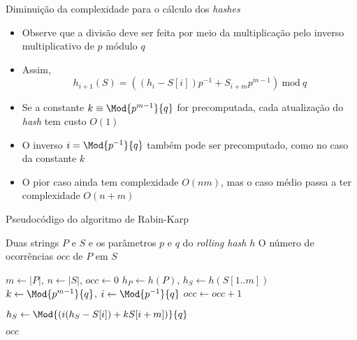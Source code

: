 \begin{frame}[fragile]{Diminuição da complexidade para o cálculo dos {\it hashes}}

    \begin{itemize}
        \item Observe que a divisão deve ser feita por meio da multiplicação pelo inverso
            multiplicativo de $p$ módulo $q$
        \pause

        \item Assim,
        \[
            h_{i+1}(S) = \left((h_{i} - S[i])p^{-1} + S_{i+m}p^{m -1}\right)\ \mbox{mod}\ q
        \]
        \pause

        \item Se a constante $k\equiv \Mod{p^{m-1}}{q}$ for precomputada, cada atualização do
            \textit{hash} tem custo $O(1)$
        \pause

        \item O inverso $i = \Mod{p^{-1}}{q}$ também pode ser precomputado, como no caso da constante $k$
        \pause

        \item O pior caso ainda tem complexidade $O(nm)$, mas o caso médio passa a ter
            complexidade $O(n + m)$

    \end{itemize}

\end{frame}

\begin{frame}[fragile]{Pseudocódigo do algoritmo de Rabin-Karp}

    \begin{algorithm}[H]
        \caption{Algoritmo de Rabin-Karp com \textit{Rolling Hash}}
        \begin{algorithmic}[1]
            \Require Duas strings $P$ e $S$ e os parâmetros $p$ e $q$ do \textit{rolling hash} $h$
            \Ensure O número de ocorrências $occ$ de $P$ em $S$

                \State $m \gets |P|$, $n \gets |S|$, $occ \gets 0$
                \State $h_P \gets h(P)$, $h_S \gets h(S[1..m])$
                \State $k \gets \Mod{p^{m - 1}}{q}$, $i \gets \Mod{p^{-1}}{q}$
                \State
                            \State $occ \gets occ + 1$
                        \EndIf
                    \EndIf

                        \State $h_S \gets \Mod{\left(i(h_S - S[i]) + kS[i + m]\right)}{q}$
                    \EndIf
                \EndFor

                \State \Return $occ$
            \EndFunction
        \end{algorithmic}
    \end{algorithm}

\end{frame}

